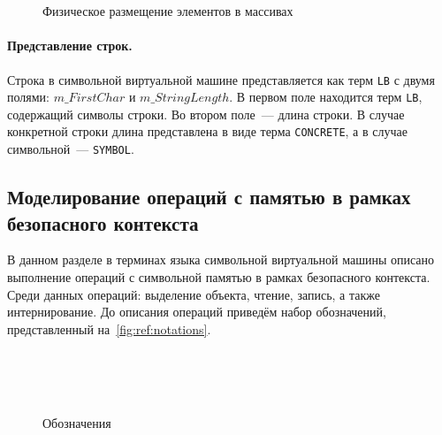 \begin{figure}
\centering
\tiny
\setlength{\jot}{1pt}
\begin{mymathbox}
     \\
     \\
\end{mymathbox}
\normalsize
\caption{Физическое размещение элементов в массивах} \label{fig:arrayPL}
\end{figure}

\paragraph{Представление строк.}
Строка в символьной виртуальной машине представляется как терм \texttt{LB} с двумя полями: $m\_FirstChar$ и $m\_StringLength$. В первом поле находится терм \texttt{LB}, содержащий символы строки. Во втором поле~--- длина строки. В случае конкретной строки длина представлена в виде терма \texttt{CONCRETE}, а в случае символьной~--- \texttt{SYMBOL}.

\subsection{Моделирование операций с памятью в рамках безопасного контекста}
В данном разделе в терминах языка символьной виртуальной машины описано выполнение операций с символьной памятью в рамках безопасного контекста. Среди данных операций: выделение объекта, чтение, запись, а также интернирование. До описания операций приведём набор обозначений, представленный на~\autoref{fig:ref:notations}.

\begin{figure}[H]
\centering
\tiny
\setlength{\jot}{1pt}
\begin{mymathbox}
 \\
 \\
 \\
\end{mymathbox}
\normalsize
\caption{Обозначения} \label{fig:ref:notations}
\end{figure}

